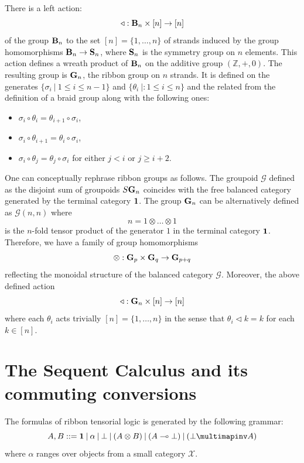 \documentclass[8pt]{article}
\theoremstyle{definition}
\theoremstyle{definition}
\theoremstyle{definition}
\theoremstyle{definition}
\theoremstyle{definition}
\theoremstyle{definition}
\theoremstyle{definition}
\theoremstyle{definition}
\theoremstyle{definition}
\theoremstyle{definition}
\theoremstyle{definition}
\theoremstyle{definition}
\theoremstyle{definition}
\theoremstyle{definition}
\theoremstyle{question}
\begin{document}
There is a left action:
\[
\triangleleft : {\bf B}_n \times [n] \to [n]
\]
of the group ${\bf B}_n$ to the set $[n] = \{ 1, \ldots, n \}$ of strands induced by the group homomorphisms
${\bf B}_n \to {\bf S}_n$, where ${\bf S}_n$ is the symmetry group on $n$ elements.
This action defines a wreath product of ${\bf B}_n$ on the additive group $(\mathbb{Z}, +, 0)$.
The resulting group is ${\bf G}_n$, the ribbon group on $n$ strands. It is defined on the generates 
$\{ \sigma_i \: | \: 1 \leq i \leq n - 1 \}$ and $\{ \theta_i \: | : 1 \leq i \leq n \}$ and the related from the definition of a braid group
along with the following ones:
\begin{itemize}
  \item $\sigma_i \circ \theta_i = \theta_{i + 1} \circ \sigma_i$,
  \item $\sigma_i \circ \theta_{i + 1} = \theta_i \circ \sigma_i$,
  \item $\sigma_i \circ \theta_j = \theta_j \circ \sigma_i$ for either $j < i$ or $j \geq i + 2$.
\end{itemize}

One can conceptually rephrase ribbon groups as follows. The groupoid $\mathcal{G}$ defined as the disjoint sum of groupoids
$S {\bf G}_n$ coincides with the free balanced category generated by the terminal category ${\bf 1}$. The group
${\bf G}_n$ can be alternatively defined as $\mathcal{G}(n,n)$ where
\[
n = 1 \otimes \ldots \otimes 1
\]
is the $n$-fold tensor product of the generator $1$ in the terminal category ${\bf 1}$. Therefore, we have a family of group homomorphisms
\[
\otimes : {\bf G}_p \times {\bf G}_q \to {\bf G}_{p + q}
\]
reflecting the monoidal structure of the balanced category $\mathcal{G}$. Moreover, the above defined action
\[
\triangleleft : {\bf G}_n \times [n] \to [n]
\]
where each $\theta_i$ acts trivially $[n] = \{ 1, \ldots, n \}$ in the sense that $\theta_i \triangleleft k = k$
for each $k \in [n]$.

\section{The Sequent Calculus and its commuting conversions}

The formulas of ribbon tensorial logic is generated by the following grammar:
\[
A, B ::= {\bf 1} \: | \: \alpha \: | \: \bot \: | \: (A \otimes B) \: | \: (A \multimap \bot) \: | \: (\bot \multimapinv A)
\]
where $\alpha$ ranges over objects from a small category $\mathcal{X}$.
\end{document}
